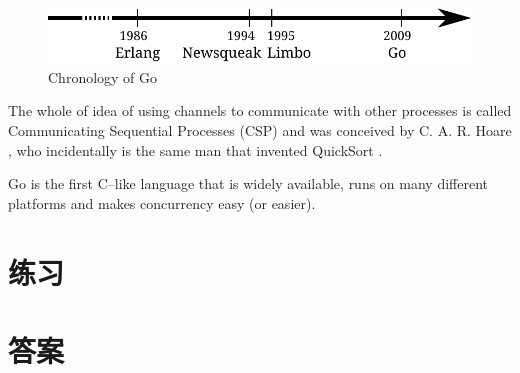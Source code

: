 \begin{figure}[H]
\caption{Chronology of Go}
\label{fig:chrono-of-go}
\begin{center}
\includegraphics[scale=0.65]{fig/go-history.pdf}
\end{center}
\end{figure}

The whole of idea of using channels to communicate with other processes
is called Communicating Sequential Processes (CSP) and was conceived
by C. A. R. Hoare \cite{hoare}, who incidentally is the same man that
invented QuickSort \cite{Quicksort}.

\begin{lbar}[]
Go is the first C--like language that is widely available,
runs on many
different platforms and makes concurrency easy (or easier).
\end{lbar}

\section{练习}


\cleardoublepage
\section{答案}
\shipoutAnswer
